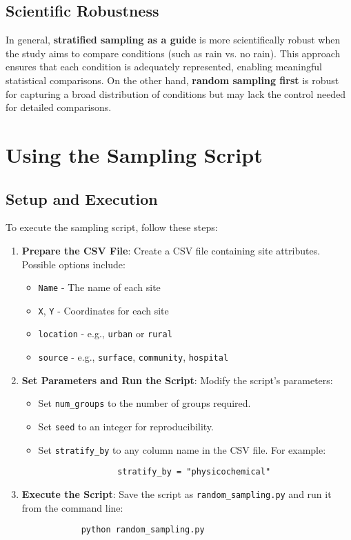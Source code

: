 \documentclass{article}
\begin{document}
	\subsection{Scientific Robustness}
	In general, \textbf{stratified sampling as a guide} is more scientifically robust when the study aims to compare conditions (such as rain vs. no rain). This approach ensures that each condition is adequately represented, enabling meaningful statistical comparisons. On the other hand, \textbf{random sampling first} is robust for capturing a broad distribution of conditions but may lack the control needed for detailed comparisons.
	
	\section{Using the Sampling Script}
	
	\subsection{Setup and Execution}
	To execute the sampling script, follow these steps:
	
	\begin{enumerate}
		
		\item \textbf{Prepare the CSV File}: Create a CSV file containing site attributes. Possible options include:
		\begin{itemize}
			\item \texttt{Name} - The name of each site
			\item \texttt{X}, \texttt{Y} - Coordinates for each site
			\item \texttt{location} - e.g., \texttt{urban} or \texttt{rural}
			\item \texttt{source} - e.g., \texttt{surface}, \texttt{community}, \texttt{hospital}
		\end{itemize}
		
		\item \textbf{Set Parameters and Run the Script}:
		Modify the script’s parameters:
		\begin{itemize}
			\item Set \texttt{num\_groups} to the number of groups required.
			\item Set \texttt{seed} to an integer for reproducibility.
			\item Set \texttt{stratify\_by} to any column name in the CSV file. For example:
			\begin{verbatim}
				stratify_by = "physicochemical"
			\end{verbatim}
		\end{itemize}
		
		\item \textbf{Execute the Script}:
		Save the script as \texttt{random\_sampling.py} and run it from the command line:
		\begin{verbatim}
			python random_sampling.py
		\end{verbatim}
	\end{enumerate}
	
\end{document}
